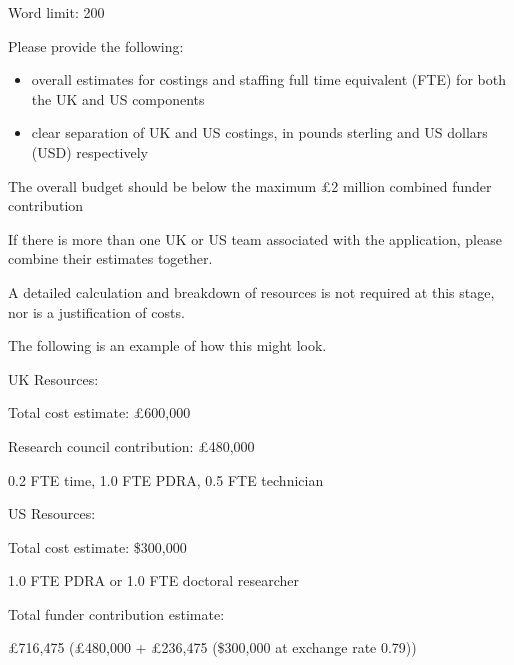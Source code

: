 \documentclass[12in]{article}
\newcommand{\referencessection}{\section*{References}}
\begin{document}
{\color{red}

Word limit: 200

Please provide the following:

\begin{itemize}

	\item overall estimates for costings and staffing full time equivalent (FTE) for both
the UK and US components

	\item clear separation of UK and US costings, in pounds sterling and US dollars
(USD) respectively

\end{itemize}

The overall budget should be below the maximum £2 million combined funder
contribution

If there is more than one UK or US team associated with the application, please
combine their estimates together.

A detailed calculation and breakdown of resources is not required at this stage,
nor is a justification of costs.

The following is an example of how this might look.

UK Resources:

Total cost estimate: £600,000

Research council contribution: £480,000

0.2 FTE time, 1.0 FTE PDRA, 0.5 FTE technician

US Resources:

Total cost estimate: \$300,000

1.0 FTE PDRA or 1.0 FTE doctoral researcher

Total funder contribution estimate:

£716,475 (£480,000 + £236,475 (\$300,000 at exchange rate 0.79))

}

{}




% 
\end{document}
